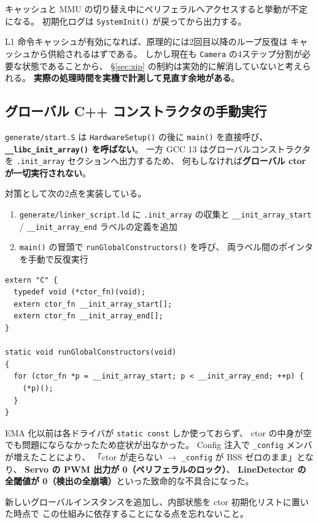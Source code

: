 \documentclass[a4paper,11pt,dvipdfmx]{jsarticle}
\begin{document}
\begin{cautionbox}
キャッシュと MMU の切り替え中にペリフェラルへアクセスすると挙動が不定になる。
初期化ログは \texttt{SystemInit()} が戻ってから出力する。
\end{cautionbox}

\begin{notebox}
L1 命令キャッシュが有効になれば、原理的には2回目以降のループ反復は
キャッシュから供給されるはずである。
しかし現在も \texttt{Camera} の4ステップ分割が必要な状態であることから、
\hyperref[sec:xip]{§\ref*{sec:xip}} の制約は実効的に解消していないと考えられる。
\textbf{実際の処理時間を実機で計測して見直す余地がある}。
\end{notebox}

\subsection{グローバル C++ コンストラクタの手動実行}\label{sec:ctors}

\texttt{generate/start.S} は \texttt{HardwareSetup()} の後に \texttt{main()} を直接呼び、
\textbf{\texttt{\_\_libc\_init\_array()} を呼ばない}。
一方 GCC 13 はグローバルコンストラクタを \texttt{.init\_array} セクションへ出力するため、
何もしなければ\textbf{グローバル ctor が一切実行されない}。

対策として次の2点を実装している。

\begin{enumerate}[nosep, leftmargin=*]
  \item \texttt{generate/linker\_script.ld} に \texttt{.init\_array} の収集と
        \texttt{\_\_init\_array\_start} / \texttt{\_\_init\_array\_end} ラベルの定義を追加
  \item \texttt{main()} の冒頭で \texttt{runGlobalConstructors()} を呼び、
        両ラベル間のポインタを手動で反復実行
\end{enumerate}

\begin{lstlisting}[caption={グローバルコンストラクタの手動実行},label=lst:ctors]
extern "C" {
  typedef void (*ctor_fn)(void);
  extern ctor_fn __init_array_start[];
  extern ctor_fn __init_array_end[];
}

static void runGlobalConstructors(void)
{
  for (ctor_fn *p = __init_array_start; p < __init_array_end; ++p) {
    (*p)();
  }
}
\end{lstlisting}

\begin{cautionbox}
EMA 化以前は各ドライバが \texttt{static const} しか使っておらず、
ctor の中身が空でも問題にならなかったため症状が出なかった。
Config 注入で \texttt{\_config} メンバが増えたことにより、
「ctor が走らない $\rightarrow$ \texttt{\_config} が BSS ゼロのまま」となり、
\textbf{Servo の PWM 出力が 0（ペリフェラルのロック）}、
\textbf{LineDetector の全閾値が 0（検出の全崩壊）}といった致命的な不具合になった。

新しいグローバルインスタンスを追加し、内部状態を ctor 初期化リストに置いた時点で
この仕組みに依存することになる点を忘れないこと。
\end{cautionbox}
\end{document}
